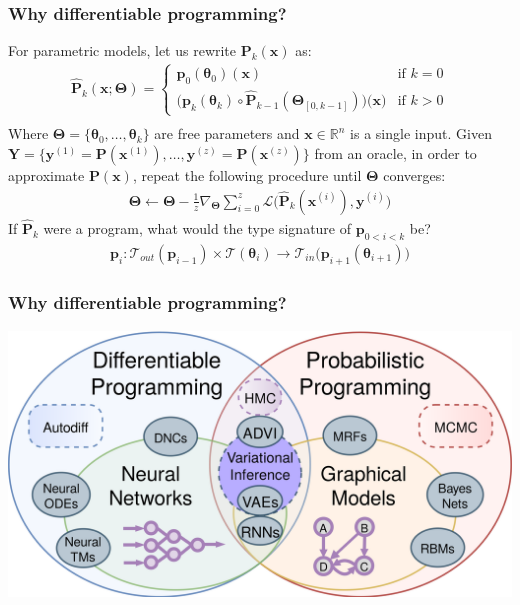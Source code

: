 \documentclass{beamer}
\begin{document}
    \begin{frame}
        \frametitle{Why differentiable programming?}
        For parametric models, let us rewrite $\mathbf{P}_k(\mathbf{x})$ as:
        \begin{align*}
            \mathbf{\hat P}_k(\mathbf{x}; \mathbf{\boldsymbol\Theta}) = \begin{cases} \mathbf{p}_0(\boldsymbol\theta_0)(\mathbf{x}) &\text{if } k=0\\ \big(\mathbf{p}_k(\boldsymbol\theta_k)\circ \mathbf{\hat P}_{k-1}(\boldsymbol\Theta_{[0, k-1]})\big)\big(\mathbf{x}\big)&\text{if } k > 0 \end{cases} \\
        \end{align*}
        Where $\boldsymbol\Theta = \{\boldsymbol\theta_0, \dots, \boldsymbol\theta_k\}$ are free parameters and $\mathbf{x} \in \mathbb{R}^n$ is a single input. Given $\mathbf{Y} = \{\mathbf{y}^{(1)} = \mathbf{P}(\mathbf{x}^{(1)}), \dots, \mathbf{y}^{(z)} = \mathbf{P}(\mathbf{x}^{(z)})\}$ from an oracle, in order to approximate $\mathbf{P}(\mathbf x)$, repeat the following procedure until $\boldsymbol\Theta$ converges:
        \begin{align*}
            \boldsymbol\Theta \leftarrow \boldsymbol\Theta - \frac{1}{z}\nabla_{\boldsymbol\Theta} \sum_{i=0}^z\mathcal{L}\big(\mathbf{\hat P}_k(\mathbf{x}^{(i)}), \mathbf{y}^{(i)}\big)
        \end{align*}
        If $\mathbf{\hat P}_{k}$ were a program, what would the type signature of $\mathbf{p}_{0<i<k}$ be?
        \begin{align*}
            \mathbf{p}_i: \mathcal{T}_{out}(\mathbf{p}_{i-1}) \times \mathcal{T}(\boldsymbol\theta_{i}) \rightarrow \mathcal{T}_{in}\big(\mathbf{p}_{i+1}(\boldsymbol\theta_{i+1})\big)
        \end{align*}
    \end{frame}


    \begin{frame}
        \frametitle{Why differentiable programming?}
        \begin{center}
            \includegraphics[scale=0.07]{../figures/diff_prob_prog.png}
        \end{center}
    \end{frame}
\end{document}

